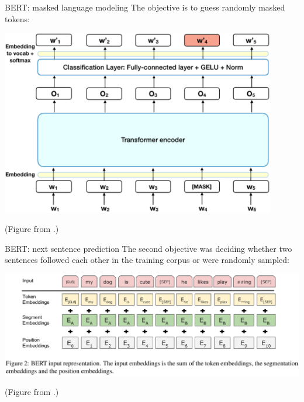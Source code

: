 \documentclass[style=upen, size=14pt]{powerdot}
\theoremstyle{definition}
\begin{document}
\begin{slide}[toc=]{BERT: masked language modeling}
  The objective is to guess randomly masked tokens:\medskip
  
  \begin{centering}
    
    \includegraphics[width=0.9\textwidth]{figures/bert1.eps}

    \footnotesize{(Figure from \cite{horev2018bert}.)}
    
  \end{centering}
\end{slide}

\begin{slide}[toc=]{BERT: next sentence prediction}
  The second objective was deciding whether two sentences followed each other in
  the training corpus or were randomly sampled:\medskip
  
  \begin{centering}
    
    \includegraphics[width=1.\textwidth]{figures/bert2.eps}

    \footnotesize{(Figure from \cite{devlin2018bert}.)}
    
  \end{centering}
\end{slide}
\end{document}
